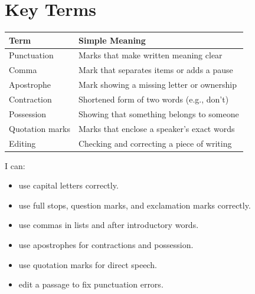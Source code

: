 \section{Key Terms}
\begin{table}[h!]
\centering
\begin{tabular}{|l|l|}
\hline
\textbf{Term} & \textbf{Simple Meaning} \\
\hline
Punctuation & Marks that make written meaning clear \\
Comma & Mark that separates items or adds a pause \\
Apostrophe & Mark showing a missing letter or ownership \\
Contraction & Shortened form of two words (e.g., don't) \\
Possession & Showing that something belongs to someone \\
Quotation marks & Marks that enclose a speaker's exact words \\
Editing & Checking and correcting a piece of writing \\
\hline
\end{tabular}
\end{table}

\begin{selfcheck}
I can:
\begin{itemize}
    \item use capital letters correctly.
    \item use full stops, question marks, and exclamation marks correctly.
    \item use commas in lists and after introductory words.
    \item use apostrophes for contractions and possession.
    \item use quotation marks for direct speech.
    \item edit a passage to fix punctuation errors.
\end{itemize}
\end{selfcheck}
